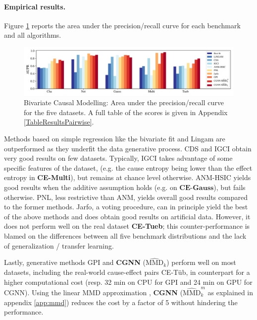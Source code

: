 \documentclass[a4paper, 11pt]{article}
\begin{document}
\paragraph{Empirical results.} Figure \ref{fig:score_pairwise} reports the area under the precision/recall curve for each benchmark and all algorithms. 

\begin{figure}[h!]
\centering
\includegraphics[width=\textwidth]{aupr_pairwise.pdf}
\caption{Bivariate Causal Modelling: Area under the precision/recall curve for the five datasets. A full table of the scores is given in Appendix \ref{TableResultsPairwise}.}
\label{fig:score_pairwise}
\end{figure}

Methods based on simple regression like the bivariate fit and Lingam are outperformed as they underfit the data generative process. CDS and IGCI obtain very good results on few datasets. 
Typically, IGCI takes advantage of some specific features of the dataset, (e.g. the cause entropy being lower than the effect entropy  in \textbf{CE-Multi}), but remains at chance level otherwise.   ANM-HSIC yields good results when the additive assumption holds (e.g. on $ \textbf{CE-Gauss}$), but fails otherwise. PNL, less restrictive than ANM, yields overall good  results compared to the former methods.  Jarfo, a voting procedure, can in principle yield the best of the above methods and does obtain good results on artificial data. However, it does not perform well on the real dataset \textbf{CE-Tueb}; this counter-performance is blamed on the differences between all five benchmark distributions and the lack of generalization / transfer learning.

Lastly, generative methods {GPI} and \textbf{CGNN} ($\widehat{\text{MMD}}_k$) perform well on most datasets, including the real-world cause-effect pairs
{CE-T\"ub}, in counterpart for a higher computational cost (resp. 32 min on CPU for GPI and 24 min on GPU for CGNN). Using the linear MMD approximation \cite{dlp}, \textbf{CGNN} ($\widehat{\text{MMD}}^m_k$ as explained in appendix \ref{app:mmd})  reduces the cost by a factor of 5 without hindering the performance. 
\end{document}
